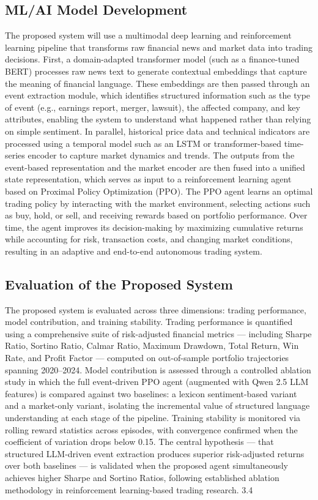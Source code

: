 \documentclass[a4paper,fleqn]{cas-sc}
\begin{document}
\subsection{ML/AI Model Development}\label{sec:Model}
The proposed system will use a multimodal deep learning and reinforcement learning pipeline that transforms raw financial news and market data into trading decisions. First, a domain-adapted transformer model (such as a finance-tuned BERT) processes raw news text to generate contextual embeddings that capture the meaning of financial language. These embeddings are then passed through an event extraction module, which identifies structured information such as the type of event (e.g., earnings report, merger, lawsuit), the affected company, and key attributes, enabling the system to understand what happened rather than relying on simple sentiment. In parallel, historical price data and technical indicators are processed using a temporal model such as an LSTM or transformer-based time-series encoder to capture market dynamics and trends. The outputs from the event-based representation and the market encoder are then fused into a unified state representation, which serves as input to a reinforcement learning agent based on Proximal Policy Optimization (PPO). The PPO agent learns an optimal trading policy by interacting with the market environment, selecting actions such as buy, hold, or sell, and receiving rewards based on portfolio performance. Over time, the agent improves its decision-making by maximizing cumulative returns while accounting for risk, transaction costs, and changing market conditions, resulting in an adaptive and end-to-end autonomous trading system. 
\subsection{Evaluation of the Proposed System}\label{sec:Evaluation}
The proposed system is evaluated across three dimensions: trading performance, model contribution, and training stability. Trading performance is quantified using a comprehensive suite of risk-adjusted financial metrics — including Sharpe Ratio, Sortino Ratio, Calmar Ratio, Maximum Drawdown, Total Return, Win Rate, and Profit Factor — computed on out-of-sample portfolio trajectories spanning 2020–2024. Model contribution is assessed through a controlled ablation study in which the full event-driven PPO agent (augmented with Qwen 2.5 LLM features) is compared against two baselines: a lexicon sentiment-based variant and a market-only variant, isolating the incremental value of structured language understanding at each stage of the pipeline. Training stability is monitored via rolling reward statistics across episodes, with convergence confirmed when the coefficient of variation drops below 0.15. The central hypothesis — that structured LLM-driven event extraction produces superior risk-adjusted returns over both baselines — is validated when the proposed agent simultaneously achieves higher Sharpe and Sortino Ratios, following established ablation methodology in reinforcement learning-based trading research. 
3.4	
\end{document}

